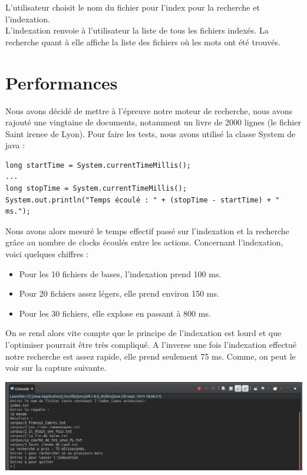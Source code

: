 \documentclass{article}
\begin{document}
L'utilisateur choisit le nom du fichier pour l'index pour la recherche et l'indexation.\\
L'indexation renvoie à l'utilisateur la liste de tous les fichiers indexés. La recherche quant à elle affiche la liste des fichiers où les mots ont été trouvés.

\section{Performances}

Nous avons décidé de mettre à l'épreuve notre moteur de recherche, nous avons rajouté une vingtaine de documents, notamment un livre de 2000 lignes (le fichier Saint irenee de Lyon).
Pour faire les tests, nous avons utilisé la classe System de java :

\begin{lstlisting}
long startTime = System.currentTimeMillis();
...
long stopTime = System.currentTimeMillis();
System.out.println("Temps écoulé : " + (stopTime - startTime) + " ms.");
\end{lstlisting}

Nous avons alors mesuré le temps effectif passé sur l'indexation et la recherche grâce au nombre de clocks écoulés
entre les actions. Concernant l'indexation, voici quelques chiffres :
\begin{itemize}
	\item Pour les 10 fichiers de bases, l'indexation prend 100 ms.
	\item Pour 20 fichiers assez légers, elle prend environ 150 ms.
	\item Pour les 30 fichiers, elle explose en passant à 800 ms.
\end{itemize}

On se rend alors vite compte que le principe de l'indexation est lourd et que l'optimiser pourrait être très
compliqué. A l'inverse une fois l'indexation effectué notre recherche est assez rapide, elle prend seulement 75 ms. Comme, on peut le voir sur la capture suivante.

\begin{center}
	\includegraphics[scale=0.4]{../data/recherche.png}
\end{center}
\end{document}
